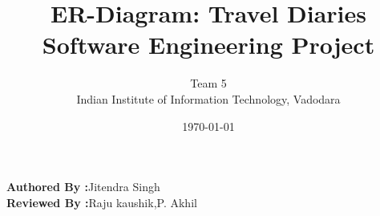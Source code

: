 \documentclass[12pt]{article}
\title{ER-Diagram: Travel Diaries\\Software Engineering Project }
\author{Team 5\\Indian Institute of Information Technology, Vadodara}
\date{\today}
\begin{document}
	\maketitle
	\begin{center}
		\textbf{\Large{Authored By :}}\Large{Jitendra Singh}  \\
		\textbf{\Large{Reviewed By :}}\Large{Raju kaushik,P. Akhil} \\[2\baselineskip]  
	\end{center}
		
	
\end{document}
